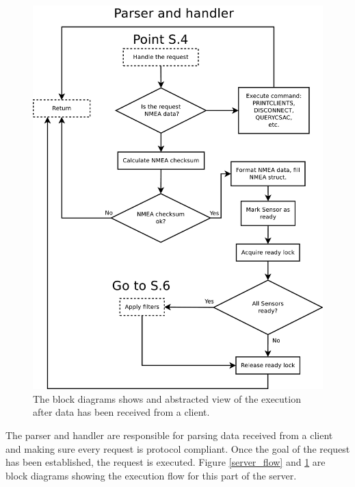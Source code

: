 \documentclass[12pt,english,a4paper]{report}
\begin{document}
\begin{figure}
\centering
  \includegraphics[scale=0.40]{actions_core.pdf}
   \caption[Socket Server execution flow block diagram]{The block diagrams shows and abstracted view of the execution after data has been received from a client.}
   \label{actions_core}
\end{figure}
The parser and handler are responsible for parsing data received from a client and making sure every request is protocol compliant. Once the goal of the request has been established, the request is executed. Figure \ref{server_flow} and \ref{actions_core} are block diagrams showing the execution flow for this part of the server.  
\end{document}
